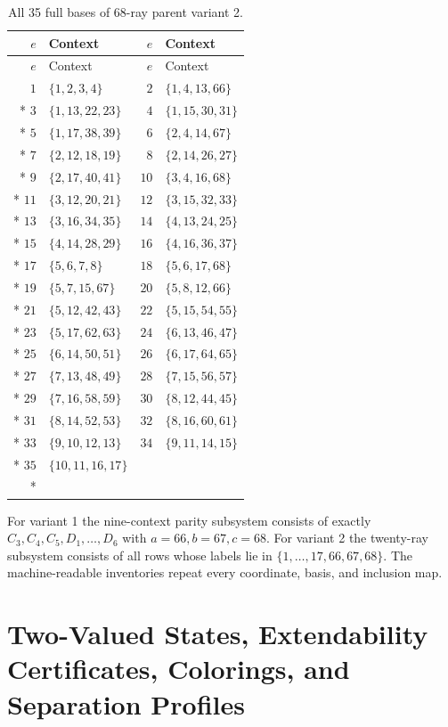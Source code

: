 \documentclass[aps,pra,reprint,superscriptaddress,longbibliography,nofootinbib,floatfix,10pt]{revtex4-2}
\theoremstyle{definition}
\begin{document}
\begin{longtable}{rlrl}
\caption{All 35 full bases of 68-ray parent variant 2.}\label{tab:cabello68-2-contexts}\\
\toprule
$e$ & Context & $e$ & Context\\\midrule
\endfirsthead
\toprule
$e$ & Context & $e$ & Context\\\midrule
\endhead
\bottomrule\endfoot
$1$ & $\{1,2,3,4\}$ & $2$ & $\{1,4,13,66\}$\\*
$3$ & $\{1,13,22,23\}$ & $4$ & $\{1,15,30,31\}$\\*
$5$ & $\{1,17,38,39\}$ & $6$ & $\{2,4,14,67\}$\\*
$7$ & $\{2,12,18,19\}$ & $8$ & $\{2,14,26,27\}$\\*
$9$ & $\{2,17,40,41\}$ & $10$ & $\{3,4,16,68\}$\\*
$11$ & $\{3,12,20,21\}$ & $12$ & $\{3,15,32,33\}$\\*
$13$ & $\{3,16,34,35\}$ & $14$ & $\{4,13,24,25\}$\\*
$15$ & $\{4,14,28,29\}$ & $16$ & $\{4,16,36,37\}$\\*
$17$ & $\{5,6,7,8\}$ & $18$ & $\{5,6,17,68\}$\\*
$19$ & $\{5,7,15,67\}$ & $20$ & $\{5,8,12,66\}$\\*
$21$ & $\{5,12,42,43\}$ & $22$ & $\{5,15,54,55\}$\\*
$23$ & $\{5,17,62,63\}$ & $24$ & $\{6,13,46,47\}$\\*
$25$ & $\{6,14,50,51\}$ & $26$ & $\{6,17,64,65\}$\\*
$27$ & $\{7,13,48,49\}$ & $28$ & $\{7,15,56,57\}$\\*
$29$ & $\{7,16,58,59\}$ & $30$ & $\{8,12,44,45\}$\\*
$31$ & $\{8,14,52,53\}$ & $32$ & $\{8,16,60,61\}$\\*
$33$ & $\{9,10,12,13\}$ & $34$ & $\{9,11,14,15\}$\\*
$35$ & $\{10,11,16,17\}$ & & \\*
\end{longtable}
\endgroup
For variant 1 the nine-context parity subsystem consists of
exactly $C_3,C_4,C_5,D_1,\ldots,D_6$ with $a=66,b=67,c=68$.
For variant 2 the twenty-ray subsystem consists of all rows whose
labels lie in $\{1,\ldots,17,66,67,68\}$. The machine-readable
inventories repeat every coordinate, basis, and inclusion map.


\clearpage
\section{Two-Valued States, Extendability Certificates, Colorings, and Separation Profiles}\label{app:all-states}\label{app:states}
\end{document}

